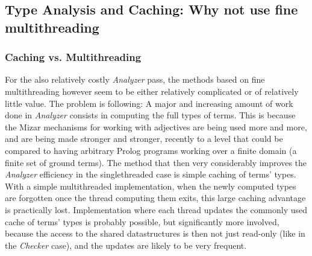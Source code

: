 \documentclass{llncs}
\begin{document}
\subsection{Type Analysis and Caching: Why not use fine
  multithreading}
\label{Types}
\subsubsection{Caching vs. Multithreading}
For the also relatively costly \emph{Analyzer} pass, the methods based
on fine multithreading however seem to be either relatively
complicated or of relatively little value. The problem is following: A
major and increasing amount of work done in \emph{Analyzer} consists
in computing the full types of terms. This is because the Mizar
mechanisms for working with adjectives are being used more and more,
and are being made stronger and stronger, recently to a level that
could be compared to having arbitrary Prolog programs working over a
finite domain (a finite set of ground terms). The method that then
very considerably improves the \emph{Analyzer} efficiency in the
singlethreaded case is simple caching of terms' types. With a simple
multithreaded implementation, when the newly computed types are
forgotten once the thread computing them exits, this large caching
advantage is practically lost. Implementation where each thread
updates the commonly used cache of terms' types is probably possible,
but significantly more involved, because the access to the shared
datastructures is then not just read-only (like in the \emph{Checker}
case), and the updates are likely to be very frequent.
\end{document}
